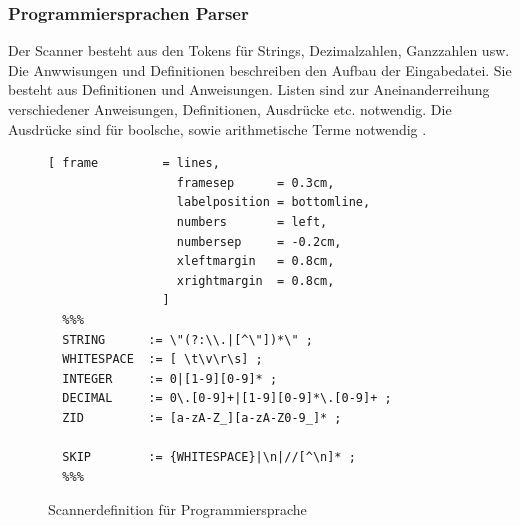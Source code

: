\subsubsection{Programmiersprachen Parser}
Der Scanner  besteht aus den Tokens für Strings, Dezimalzahlen, Ganzzahlen usw.
Die Anwwisungen und Definitionen  beschreiben den Aufbau der Eingabedatei. Sie besteht aus Definitionen und Anweisungen.
Listen  sind zur Aneinanderreihung verschiedener Anweisungen, Definitionen, Ausdrücke etc. notwendig. 
Die Ausdrücke sind für boolsche, sowie arithmetische Terme notwendig .
%
\begin{figure}[!ht]

\begin{Verbatim}[ frame         = lines, 
                  framesep      = 0.3cm, 
                  labelposition = bottomline,
                  numbers       = left,
                  numbersep     = -0.2cm,
                  xleftmargin   = 0.8cm,
                  xrightmargin  = 0.8cm,
                ]
  %%%
  STRING      := \"(?:\\.|[^\"])*\" ;
  WHITESPACE  := [ \t\v\r\s] ;
  INTEGER     := 0|[1-9][0-9]* ;
  DECIMAL     := 0\.[0-9]+|[1-9][0-9]*\.[0-9]+ ;
  ZID         := [a-zA-Z_][a-zA-Z0-9_]* ;

  SKIP        := {WHITESPACE}|\n|//[^\n]* ;
  %%%
\end{Verbatim}
\caption{Scannerdefinition für Programmiersprache}
\label{fig:example_interpreter_grammar_scanner}
\end{figure}
